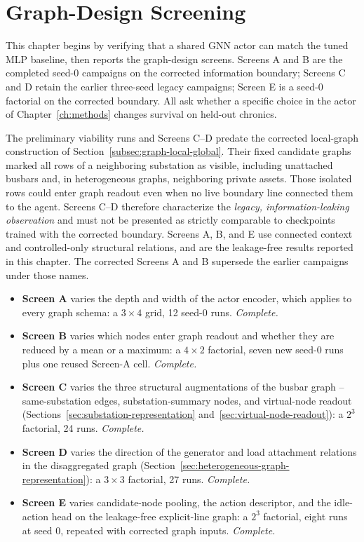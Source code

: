 \chapter{Graph-Design Screening}
\label{ch:experiments}

This chapter begins by verifying that a shared GNN actor can match the tuned
MLP baseline, then reports the graph-design screens. Screens A and B are the
completed seed-0 campaigns on the corrected information boundary; Screens C
and D retain the earlier three-seed legacy campaigns; Screen E is a seed-0
factorial on the corrected boundary. All ask whether a specific choice in the
actor of Chapter~\ref{ch:methods} changes survival on held-out chronics.

\begin{tcolorbox}[
  colframe=darkred,
  colback=red!4!white,
  title=Information-boundary status of the reported screens
]
The preliminary viability runs and Screens C--D predate the corrected
local-graph construction of
Section~\ref{subsec:graph-local-global}. Their fixed candidate graphs marked
all rows of a neighboring substation as visible, including unattached busbars
and, in heterogeneous graphs, neighboring private assets. Those isolated rows
could enter graph readout even when no live boundary line connected them to the
agent. Screens C--D therefore characterize the \emph{legacy,
information-leaking observation} and must not be presented as strictly
comparable to checkpoints trained with the corrected boundary. Screens A, B,
and E use connected context and controlled-only structural relations, and are
the leakage-free results reported in this chapter. The corrected Screens A and
B supersede the earlier campaigns under those names.
\end{tcolorbox}

\begin{itemize}
  \item \textbf{Screen A} varies the depth and width of the actor encoder,
  which applies to every graph schema: a $3\times4$ grid, 12 seed-0 runs.
  \emph{Complete.}
  \item \textbf{Screen B} varies which nodes enter graph readout and whether
  they are reduced by a mean or a maximum: a $4\times2$ factorial, seven new
  seed-0 runs plus one reused Screen-A cell. \emph{Complete.}
  \item \textbf{Screen C} varies the three structural augmentations of the
  busbar graph -- same-substation edges, substation-summary nodes, and
  virtual-node readout (Sections~\ref{sec:substation-representation}
  and~\ref{sec:virtual-node-readout}): a $2^3$ factorial, 24 runs.
  \emph{Complete.}
  \item \textbf{Screen D} varies the direction of the generator and load
  attachment relations in the disaggregated graph
  (Section~\ref{sec:heterogeneous-graph-representation}): a $3\times3$
  factorial, 27 runs. \emph{Complete.}
  \item \textbf{Screen E} varies candidate-node pooling, the action descriptor,
  and the idle-action head on the leakage-free explicit-line graph: a $2^3$
  factorial, eight runs at seed 0, repeated with corrected graph inputs.
  \emph{Complete.}
\end{itemize}

